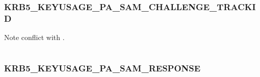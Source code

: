 \documentclass[letterpaper,10pt,english]{sphinxmanual}
\begin{document}
\begin{fulllineitems}
\label{appdev/refs/macros/KRB5_KEYUSAGE_PA_SAM_CHALLENGE_CKSUM:KRB5_KEYUSAGE_PA_SAM_CHALLENGE_CKSUM}
\end{fulllineitems}


\begin{tabulary}{\linewidth}{|L|L|}
\hline

 & 
\\
\hline\end{tabulary}



\subsubsection{KRB5\_KEYUSAGE\_PA\_SAM\_CHALLENGE\_TRACKID}
\label{appdev/refs/macros/KRB5_KEYUSAGE_PA_SAM_CHALLENGE_TRACKID:krb5-keyusage-pa-sam-challenge-trackid}\label{appdev/refs/macros/KRB5_KEYUSAGE_PA_SAM_CHALLENGE_TRACKID:krb5-keyusage-pa-sam-challenge-trackid-data}\label{appdev/refs/macros/KRB5_KEYUSAGE_PA_SAM_CHALLENGE_TRACKID::doc}

\begin{fulllineitems}
\label{appdev/refs/macros/KRB5_KEYUSAGE_PA_SAM_CHALLENGE_TRACKID:KRB5_KEYUSAGE_PA_SAM_CHALLENGE_TRACKID}
\end{fulllineitems}


Note conflict with  .

\begin{tabulary}{\linewidth}{|L|L|}
\hline

 & 
\\
\hline\end{tabulary}



\subsubsection{KRB5\_KEYUSAGE\_PA\_SAM\_RESPONSE}
\label{appdev/refs/macros/KRB5_KEYUSAGE_PA_SAM_RESPONSE:krb5-keyusage-pa-sam-response-data}\label{appdev/refs/macros/KRB5_KEYUSAGE_PA_SAM_RESPONSE:krb5-keyusage-pa-sam-response}\label{appdev/refs/macros/KRB5_KEYUSAGE_PA_SAM_RESPONSE::doc}
\end{document}

